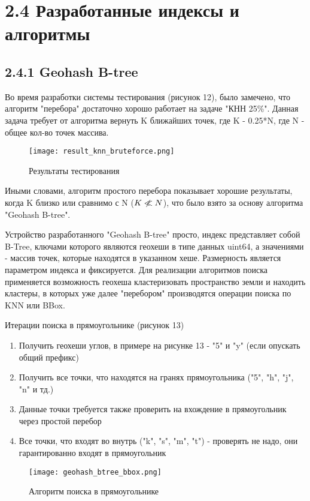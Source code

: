 \section{2.4 Разработанные индексы и алгоритмы}

\subsection{2.4.1 Geohash B-tree}
Во время разработки системы тестирования (рисунок 12), было замечено, что алгоритм "перебора" достаточно хорошо работает на задаче "КНН 25\%". Данная задача требует от алгоритма вернуть K ближайших точек, где K - 0.25*N, где N - общее кол-во точек массива. 

\begin{figure}[h]
    \centering
    \texttt{[image: result\_knn\_bruteforce.png]}
    \caption{Результаты тестирования}
\end{figure}

Иными словами, алгоритм простого перебора показывает хорошие результаты, когда K близко или сравнимо с N ($K \centernot \ll N$), что было взято за основу алгоритма "Geohash B-tree". 

Устройство разработанного "Geohash B-tree" просто, индекс представляет собой B-Tree, ключами которого являются геохеши в типе данных uint64, а значениями - массив точек, которые находятся в указанном хеше. Размерность является параметром индекса и фиксируется. Для реализации алгоритмов поиска применяется возможность геохеша кластеризовать пространство земли и находить кластеры, в которых уже далее "перебором" производятся операции поиска по KNN или BBox.


Итерации поиска в прямоугольнике (рисунок 13)
\begin{enumerate}
    \item Получить геохеши углов, в примере на рисунке 13 - "5" и "y" (если опускать общий префикс)
    \item Получить все точки, что находятся на гранях прямоугольника ("5", "h", "j", "n" и тд.)
    \item Данные точки требуется также проверить на вхождение в прямоугольник через простой перебор
    \item Все точки, что входят во внутрь ("k", "s", "m", "t") - проверять не надо, они гарантированно входят в прямоугольник
\end{enumerate}

\begin{figure}[h]
    \centering
    \texttt{[image: geohash\_btree\_bbox.png]}
    \caption{Алгоритм поиска в прямоугольнике}
\end{figure}


